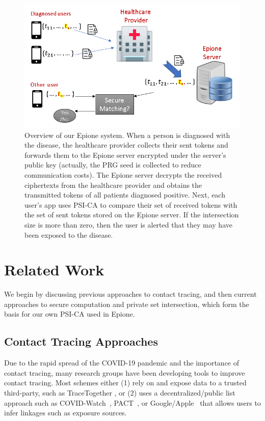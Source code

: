 \documentclass[11pt]{article} %
\newcommand{\dect}{\textsf{Epione}\xspace}
\newcommand{\psica}{PSI-CA\xspace}
\begin{document}
\begin{figure}[t]
	\centering
	\includegraphics[scale=0.54,bb= 0 0 537 380]{figs/overview_system.PNG}
	\caption{Overview of our \dect system. When a person is diagnosed with the disease, the healthcare provider collects their sent tokens and forwards them to the \dect server encrypted under the server's public key (actually, the PRG seed is collected to reduce communication costs). The \dect server decrypts the received ciphertexts from the healthcare provider and obtains the transmitted tokens of all patients diagnosed positive. Next, each user's app uses \psica to compare their set of received tokens with the set of sent tokens stored on the \dect server. If the intersection size is more than zero, then the user is alerted that they may have been exposed to the disease.}	
	\label{fig:overview_system}
\end{figure}


\section{Related Work} 

We begin by discussing previous approaches to contact tracing, and then current approaches to secure computation and private set intersection, which form the basis for our own \psica used in \dect.

\subsection{Contact Tracing Approaches}
\label{subs:rel_work_ct}
Due to the rapid spread of the COVID-19 pandemic and the importance of contact tracing, many research groups have been developing tools to improve contact tracing. Most schemes either (1) rely on and expose data to a trusted third-party, such as TraceTogether \cite{ttg}, or (2) uses a decentralized/public list approach such as COVID-Watch~\cite{Covid-watch}, PACT~\cite{chan2020pact}, or Google/Apple~\cite{google-apple} that allows users to infer linkages such as exposure sources.
\end{document}
